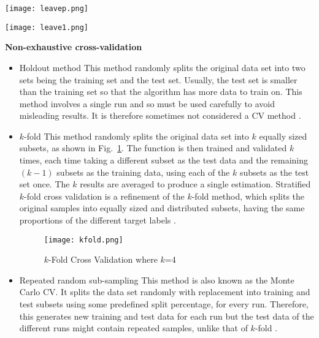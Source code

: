 \begin{figure*}
\centering
\begin{subfloat}
  \centering
  \texttt{[image: leavep.png]}
  \caption{Leave-p-Out}
  \end{subfloat}
 \begin{subfloat}
  \centering
  \texttt{[image: leave1.png]}
  \caption{Leave-One-Out}
  \end{subfloat}
  \caption{Exhaustive cross-validation methods: Leave-p-Out (left) \& Leave-One-Out (right)}
  \label{fig:leavep}
\end{figure*}

\break\noindent\textbf{Non-exhaustive cross-validation}
\begin{itemize}
\item Holdout method \newline {}
This method randomly splits the original data set into two sets being the training set and the test set. Usually, the test set is smaller than the training set so that the algorithm has more data to train on. This method involves a single run and so must be used carefully to avoid misleading results. It is therefore sometimes not considered a CV method \cite{kohavi1995study}.

\item $k$-fold\newline {}
This method randomly splits the original data set into $k$ equally sized subsets, as shown in Fig.~\ref{fig:kfold}. The function is then trained and validated $k$ times, each time taking a different subset as the test data and the remaining $(k-1)$ subsets as the training data, using each of the $k$ subsets as the test set once. The $k$ results are averaged to produce a single estimation. Stratified $k$-fold cross validation is a refinement of the $k$-fold method, which splits the original samples into equally sized and distributed subsets, having the same proportions of the different target labels \cite{kohavi1995study}.

\begin{figure}
\centering
  \texttt{[image: kfold.png]}
  \caption{$k$-Fold Cross Validation where $k$=4}
  \label{fig:kfold}
\end{figure}

\item Repeated random sub-sampling\newline {}
This method is also known as the Monte Carlo CV. It splits the data set randomly with replacement into training and test subsets using some predefined split percentage, for every run. Therefore, this generates new training and test data for each run but the test data of the different runs might contain repeated samples, unlike that of $k$-fold \cite{xu2001monte}.
\end{itemize}

